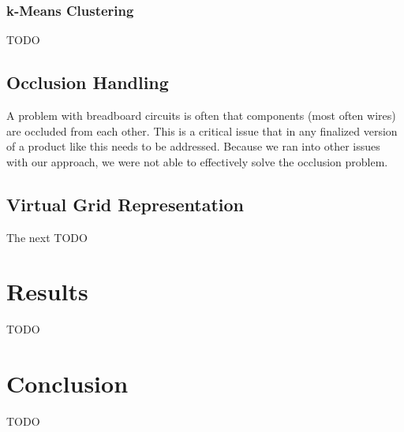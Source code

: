 \documentclass[10pt,twocolumn,letterpaper]{article}
\begin{document}
\subsubsection{k-Means Clustering}

TODO

\subsection{Occlusion Handling}

A problem with breadboard circuits is often that components (most often wires)
are occluded from each other. This is a critical issue that in any finalized
version of a product like this needs to be addressed. Because we ran into other
issues with our approach, we were not able to effectively solve the occlusion
problem.  

\subsection{Virtual Grid Representation}

The next 
TODO

\section{Results}

TODO

\section{Conclusion}

TODO

{\small


}
\end{document}
